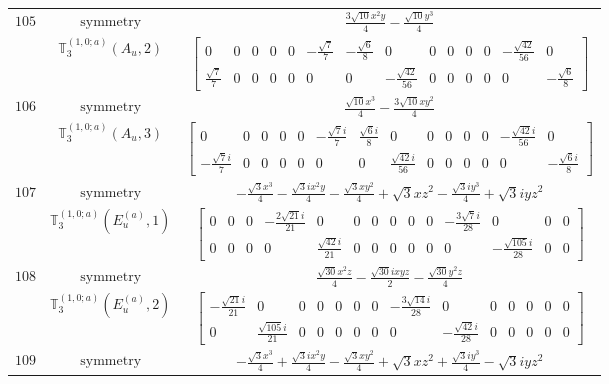 \documentclass[fleqn,8pt,landscape]{jsarticle}
\begin{document}
\begin{longtable}{ccc}
$ 105 $ & $ \text{symmetry} $ & $ \frac{3 \sqrt{10} x^{2} y}{4} - \frac{\sqrt{10} y^{3}}{4} $ \\
$  $ & $ \mathbb{T}_{3}^{(1,0;a)}(A_{u},2) $ & $ \begin{bmatrix} 0 & 0 & 0 & 0 & 0 & - \frac{\sqrt{7}}{7} & - \frac{\sqrt{6}}{8} & 0 & 0 & 0 & 0 & 0 & - \frac{\sqrt{42}}{56} & 0 \\ \frac{\sqrt{7}}{7} & 0 & 0 & 0 & 0 & 0 & 0 & - \frac{\sqrt{42}}{56} & 0 & 0 & 0 & 0 & 0 & - \frac{\sqrt{6}}{8} \end{bmatrix} $ \\ \hline
$ 106 $ & $ \text{symmetry} $ & $ \frac{\sqrt{10} x^{3}}{4} - \frac{3 \sqrt{10} x y^{2}}{4} $ \\
$  $ & $ \mathbb{T}_{3}^{(1,0;a)}(A_{u},3) $ & $ \begin{bmatrix} 0 & 0 & 0 & 0 & 0 & - \frac{\sqrt{7} i}{7} & \frac{\sqrt{6} i}{8} & 0 & 0 & 0 & 0 & 0 & - \frac{\sqrt{42} i}{56} & 0 \\ - \frac{\sqrt{7} i}{7} & 0 & 0 & 0 & 0 & 0 & 0 & \frac{\sqrt{42} i}{56} & 0 & 0 & 0 & 0 & 0 & - \frac{\sqrt{6} i}{8} \end{bmatrix} $ \\ \hline
$ 107 $ & $ \text{symmetry} $ & $ - \frac{\sqrt{3} x^{3}}{4} - \frac{\sqrt{3} i x^{2} y}{4} - \frac{\sqrt{3} x y^{2}}{4} + \sqrt{3} x z^{2} - \frac{\sqrt{3} i y^{3}}{4} + \sqrt{3} i y z^{2} $ \\
$  $ & $ \mathbb{T}_{3}^{(1,0;a)}(E_{u}^{(a)},1) $ & $ \begin{bmatrix} 0 & 0 & 0 & - \frac{2 \sqrt{21} i}{21} & 0 & 0 & 0 & 0 & 0 & 0 & - \frac{3 \sqrt{7} i}{28} & 0 & 0 & 0 \\ 0 & 0 & 0 & 0 & \frac{\sqrt{42} i}{21} & 0 & 0 & 0 & 0 & 0 & 0 & - \frac{\sqrt{105} i}{28} & 0 & 0 \end{bmatrix} $ \\ \hline
$ 108 $ & $ \text{symmetry} $ & $ \frac{\sqrt{30} x^{2} z}{4} - \frac{\sqrt{30} i x y z}{2} - \frac{\sqrt{30} y^{2} z}{4} $ \\
$  $ & $ \mathbb{T}_{3}^{(1,0;a)}(E_{u}^{(a)},2) $ & $ \begin{bmatrix} - \frac{\sqrt{21} i}{21} & 0 & 0 & 0 & 0 & 0 & 0 & - \frac{3 \sqrt{14} i}{28} & 0 & 0 & 0 & 0 & 0 & 0 \\ 0 & \frac{\sqrt{105} i}{21} & 0 & 0 & 0 & 0 & 0 & 0 & - \frac{\sqrt{42} i}{28} & 0 & 0 & 0 & 0 & 0 \end{bmatrix} $ \\ \hline
$ 109 $ & $ \text{symmetry} $ & $ - \frac{\sqrt{3} x^{3}}{4} + \frac{\sqrt{3} i x^{2} y}{4} - \frac{\sqrt{3} x y^{2}}{4} + \sqrt{3} x z^{2} + \frac{\sqrt{3} i y^{3}}{4} - \sqrt{3} i y z^{2} $ \\

\end{longtable}
\end{document}
